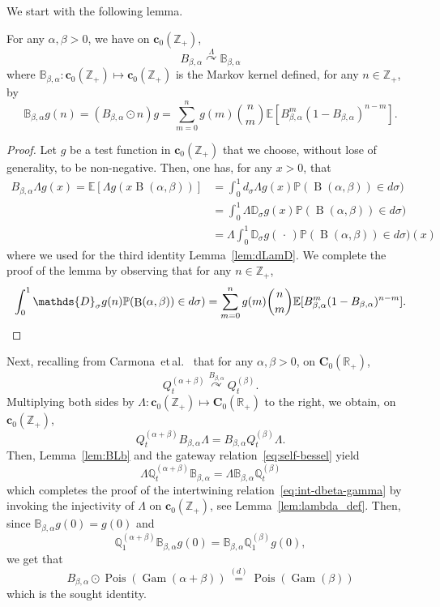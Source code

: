 \documentclass[AHL,Unicode,longabstracts]{cedram}
\DeclareMathOperator{\Pois}{Pois}
\DeclareMathOperator{\Gam}{Gam}
\DeclareMathOperator{\rmB}{B}
\newcommand{\PP}{\mathbb{P}}
\newcommand{\RR}{\mathbb{R}}
\newcommand{\ZZ}{\mathbb{Z}}
\newcommand{\esC}{\mathbf{C}}
\newcommand{\esc}{\mathbf{c}}
\newcommand*\E{{\mathbb E}}
\newcommand{\discret}[1]{\mathds{#1}}
\newcommand{\Gate}[3]{#1\stackrel{#2}{\curvearrowright}#3}
\begin{document}
We start with the following lemma.

\begin{lemm}\label{lem:BLb}
For any $\alpha,\beta>0$, we have on $\esc_0(\ZZ_+)$,
\begin{equation}\label{eq:gatBLb}
\Gate{B_{\beta,\alpha}}{\Lambda}{\discret{B}_{\beta,\alpha}}
\end{equation}
where $\discret{B}_{\beta,\alpha}: \esc_0(\ZZ_+)\mapsto \esc_0(\ZZ_+)$ is the Markov kernel defined, for any $n\in \ZZ_+$, by
\[
\discret{B}_{\beta,\alpha}g(n)=(B_{\beta,\alpha} \odot n) g=\sum_{m=0}^n g(m)\binom{n}{m}\E[B_{\beta,\alpha}^m(1-B_{\beta,\alpha})^{n-m}].
\]
\end{lemm}

\begin{proof}
Let $g$ be a test function in $\esc_0(\ZZ_+)$ that we choose, without lose of generality, to be non-negative. Then, one has, for any $x>0$, that
\begin{align*}
B_{\beta,\alpha} \Lambda g(x)= \E\left[\Lambda g(x \rmB(\alpha,\beta))\right] &= \int_{0}^{1} d_\sigma \Lambda g(x) \PP(\rmB(\alpha,\beta))\in d\sigma) \\
&= \int_{0}^{1} \Lambda \discret{D}_{\sigma} g(x) \PP(\rmB(\alpha,\beta))\in d\sigma)\\
&= \Lambda \int_{0}^{1} \discret{D}_{\sigma} g({\,\cdot\,}) \PP(\rmB(\alpha,\beta))\in d\sigma)(x)
\end{align*}
where we used for the third identity Lemma~\ref{lem:dLamD}. We complete the proof of the lemma by observing that for any $n\in \ZZ_+$,
\[
\int_{0}^{1} \discret{D}_{\sigma} g(n) \PP(\rmB(\alpha,\beta))\in d\sigma)=\sum_{m=0}^n g(m)\binom{n}{m}\E[B_{\beta,\alpha}^m(1-B_{\beta,\alpha})^{n-m}].\qedhere
\]
\end{proof}

Next, recalling from Carmona~et\,al.~\cite{Carmona-Petit-Yor-98} that for any $\alpha,\beta>0$, on $\esC_0(\RR_+)$,
\[
\Gate{Q^{(\alpha+\beta)}_t}{ {{B}}_{\beta,\alpha}}{Q^{(\beta)}_t}.
\]
Multiplying both sides by $\Lambda: \esc_0(\ZZ_+) \mapsto \esC_0(\RR_+)$ to the right, we obtain, on $\esc_0(\ZZ_+)$,
\[
Q^{(\alpha+\beta)}_t{{B}}_{\beta,\alpha}\Lambda = {{B}}_{\beta,\alpha} Q^{(\beta)}_t\Lambda.
\]
Then, Lemma~\ref{lem:BLb} and the gateway relation~\eqref{eq:self-bessel} yield
\[
\Lambda \discret{Q}^{(\alpha+\beta)}_t{\discret{B}}_{\beta,\alpha} = \Lambda {\discret{B}}_{\beta,\alpha} \discret Q^{(\beta)}_t
\]
which completes the proof of the intertwining relation~\eqref{eq:int-dbeta-gamma} by invoking the injectivity of $\Lambda$ on $\esc_0(\ZZ_+)$, see Lemma~\ref{lem:lambda_def}. Then, since ${\discret{B}}_{\beta,\alpha} g(0)=g(0)$ and
\[
\discret{Q}^{(\alpha+\beta)}_1{\discret{B}}_{\beta,\alpha}g(0) = {\discret{B}}_{\beta,\alpha} \discret Q^{(\beta)}_1 g(0),
\]
we get that
\[
B_{\beta,\alpha} \odot\Pois(\Gam(\alpha+\beta))\stackrel{(d)}{=}\Pois(\Gam(\beta))
\]
which is the sought identity.
\end{document}
